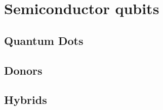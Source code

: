 \section{Semiconductor qubits}\label{SEC:semi_qubits}

\subsection{Quantum Dots}
\subsection{Donors}
\subsection{Hybrids}